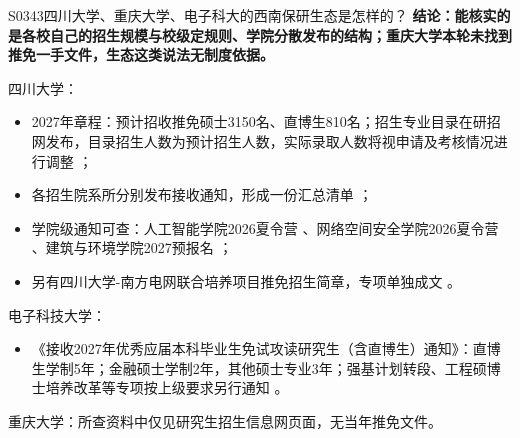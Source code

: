 \begin{qa}{S0343}{四川大学、重庆大学、电子科大的西南保研生态是怎样的？}
\textbf{结论：能核实的是各校自己的招生规模与校级定规则、学院分散发布的结构；重庆大学本轮未找到推免一手文件，生态这类说法无制度依据。}

四川大学：
\begin{itemize}
  \item 2027年章程：预计招收推免硕士3150名、直博生810名；招生专业目录在研招网发布，目录招生人数为预计招生人数，实际录取人数将视申请及考核情况进行调整 ；
  \item 各招生院系所分别发布接收通知，形成一份汇总清单 ；
  \item 学院级通知可查：人工智能学院2026夏令营 、网络空间安全学院2026夏令营 、建筑与环境学院2027预报名 ；
  \item 另有四川大学-南方电网联合培养项目推免招生简章，专项单独成文 。
\end{itemize}

电子科技大学：
\begin{itemize}
  \item 《接收2027年优秀应届本科毕业生免试攻读研究生（含直博生）通知》：直博生学制5年；金融硕士学制2年，其他硕士专业3年；强基计划转段、工程硕博士培养改革等专项按上级要求另行通知 。
\end{itemize}

重庆大学：所查资料中仅见研究生招生信息网页面，无当年推免文件。
\end{qa}

